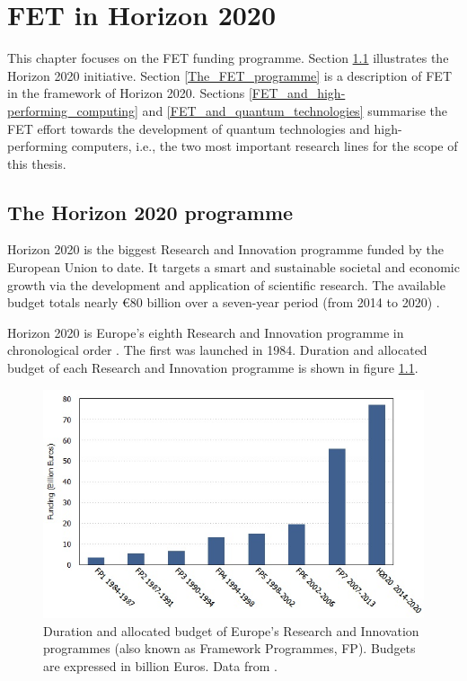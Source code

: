 \chapter{FET in Horizon 2020}
This chapter focuses on the FET funding programme. Section \ref{The_Horizon_2020_programme} illustrates the Horizon 2020 initiative. Section \ref{The_FET_programme} is a description of FET in the framework of Horizon 2020. Sections \ref{FET_and_high-performing_computing} and \ref{FET_and_quantum_technologies} summarise the FET effort towards the development of quantum technologies and high-performing computers, i.e., the two most important research lines for the scope of this thesis.

\section{The Horizon 2020 programme} \label{The_Horizon_2020_programme}
Horizon 2020 is the biggest Research and Innovation programme funded by the European Union to date. It targets a smart and sustainable societal and economic growth via the development and application of scientific research. The available budget totals nearly \euro 80 billion over a seven-year period (from 2014 to 2020) \cite{Horizon2020}.

Horizon 2020 is Europe's eighth Research and Innovation programme in chronological order \cite{FP4,FP5,FP6,FP7}. The first was launched in 1984. Duration and allocated budget of each Research and Innovation programme is shown in figure \ref{FP_funds}.

\begin{figure}[!t] 
 \begin{center}
 \includegraphics[scale=0.4]{Images/FP_funds.jpg}
 \caption{Duration and allocated budget of Europe's Research and Innovation programmes (also known as Framework Programmes, FP). Budgets are expressed in billion Euros. Data from \cite{FPBudget}.}
 \label{FP_funds}
 \end{center}
\end{figure}

